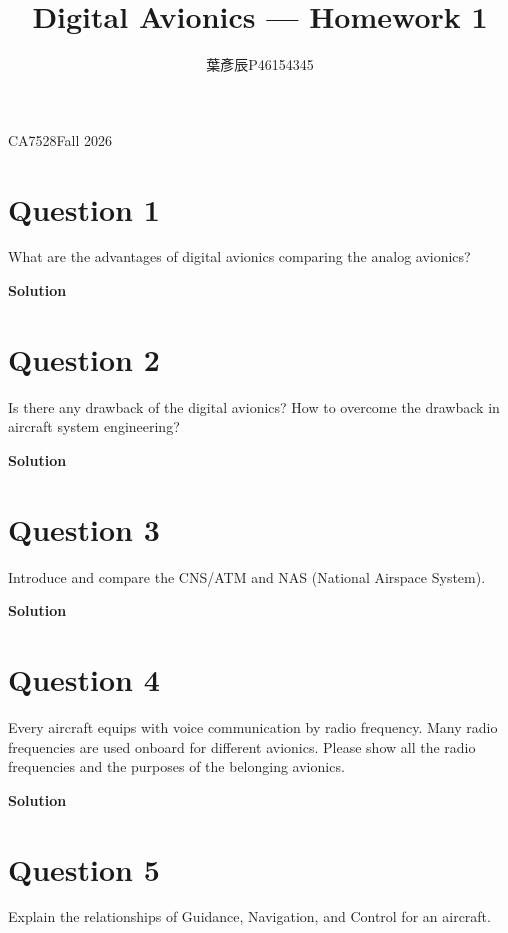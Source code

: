 \documentclass[12pt,a4paper]{article}
\title{Digital Avionics --- Homework 1}
\author{葉彥辰\quad P46154345}
\date{}
\begin{document}
\maketitle
\begin{center}CA7528\quad Fall 2026\end{center}


\section*{Question 1}
What are the advantages of digital avionics comparing the analog avionics?

\textbf{Solution}


\vspace{1.5cm}

\section*{Question 2}
Is there any drawback of the digital avionics? How to overcome the drawback in aircraft system engineering?

\textbf{Solution}
\vspace{1.5cm}

\section*{Question 3}
Introduce and compare the CNS/ATM and NAS (National Airspace System).

\textbf{Solution}
\vspace{1.5cm}

\newpage
\section*{Question 4}
Every aircraft equips with voice communication by radio frequency. Many radio frequencies are used onboard for different avionics. Please show all the radio frequencies and the purposes of the belonging avionics.

\textbf{Solution}
\vspace{2cm}

\section*{Question 5}
Explain the relationships of Guidance, Navigation, and Control for an aircraft.
\end{document}
